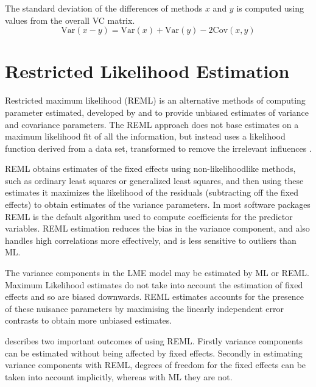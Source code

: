 \documentclass[MAIN.tex]{subfiles}
\begin{document}
The standard deviation of the differences of methods $x$ and $y$ is computed using values from the overall VC matrix.
\[
\mbox{Var}(x - y ) = \mbox{Var} ( x )  + \mbox{Var} ( y ) - 2\mbox{Cov} ( x ,y )
\]






\section{Restricted Likelihood Estimation}

Restricted maximum likelihood (REML) is an alternative methods of
computing parameter estimated, developed by \citet*{PT71} and
\citet{Harville} to provide unbiased estimates of variance and
covariance parameters. The REML approach does not base estimates on a maximum likelihood fit of all the information, but instead uses a likelihood function derived from a data set, transformed to remove the irrelevant influences \citep{REMLDefine}.
%		

REML obtains estimates of the fixed effects using non-likelihoodlike methods, such as ordinary least squares or generalized least squares, and then using these estimates it
maximizes the likelihood of the residuals (subtracting off the
fixed effects) to obtain estimates of the variance parameters. In
most software packages REML is the default algorithm used to
compute coefficients for the predictor variables. REML estimation
reduces the bias in the variance component, and also handles high
correlations more effectively, and is less sensitive to outliers
than ML.

The variance components in the LME model may be estimated by ML or REML. Maximum Likelihood estimates do not take into account the estimation of fixed effects and so
are biased downwards. REML estimates accounts for the presence of these nuisance parameters by maximising the linearly independent error contrasts to obtain more unbiased estimates.







\citet{McCullSearle} describes two important outcomes of using
REML. Firstly variance components can be estimated without being
affected by fixed effects. Secondly in estimating variance
components with REML, degrees of freedom for the fixed effects can
be taken into account implicitly, whereas with ML they are not.
\end{document}
